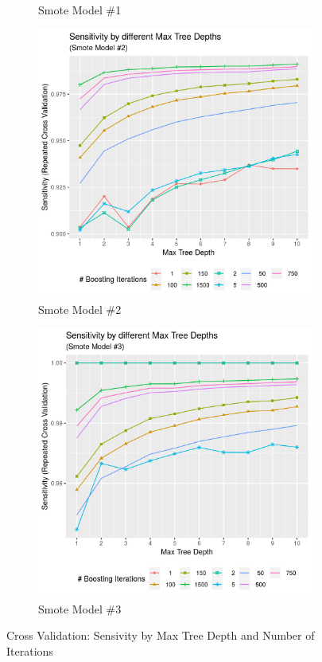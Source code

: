 \documentclass[12pt,a4paper]{article}
\begin{document}
\begin{appendices}
\begin{figure}[h!]
\begin{subfigure}{0.48\textwidth}
\caption{Smote Model \#1} \label{fig:a}
\end{subfigure}
\begin{subfigure}{0.48\textwidth}
\includegraphics[width=\linewidth]{./graphics/cv/Sens_by_treeDepth_smote2.png}
\caption{Smote Model \#2} \label{fig:a}
\end{subfigure}\hspace*{\fill}
\begin{subfigure}{0.48\textwidth}
\includegraphics[width=\linewidth]{./graphics/cv/Sens_by_treeDepth_smote3.png}
\caption{Smote Model \#3} \label{fig:a}
\end{subfigure}
\caption{Cross Validation: Sensivity by Max Tree Depth and Number of Iterations}
\end{figure}
\pagebreak
\clearpage

\end{appendices}
\end{document}
